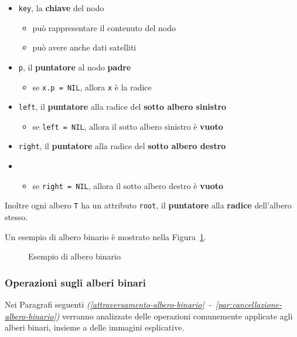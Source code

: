 \documentclass[italian, 10pt]{article}
\begin{document}
\begin{itemize}
  \item \texttt{key}, la \textbf{chiave} del nodo
        \begin{itemize}
          \item può rappresentare il contenuto del nodo
          \item può avere anche dati satelliti
        \end{itemize}
  \item \texttt{p}, il \textbf{puntatore} al nodo \textbf{padre}
        \begin{itemize}
          \item se \texttt{x.p = NIL}, allora \texttt{x} è la radice
        \end{itemize}
  \item \texttt{left}, il \textbf{puntatore} alla radice del \textbf{sotto albero sinistro}
        \begin{itemize}[label=\(\rightarrow\)]
          \item se \texttt{left = NIL}, allora il sotto albero sinistro è \textbf{vuoto}
        \end{itemize}
  \item \texttt{right}, il \textbf{puntatore} alla radice del \textbf{sotto albero destro}
  \item   \begin{itemize}[label=\(\rightarrow\)]
          \item se \texttt{right = NIL}, allora il sotto albero destro è \textbf{vuoto}
        \end{itemize}
\end{itemize}

Inoltre ogni albero \texttt{T} ha un attributo \texttt{root}, il \textbf{puntatore} alla \textbf{radice} dell'albero stesso.

\bigskip
Un esempio di albero binario è mostrato nella Figura~\ref{fig:esempio-albero-binario}.

\begin{figure}[htbp]
  \bigskip
  \centering
  \caption{Esempio di albero binario}
  \label{fig:esempio-albero-binario}
  \bigskip
\end{figure}

\subsubsection{Operazioni sugli alberi binari}

Nei Paragrafi seguenti \textit{(\ref{attraversamento-albero-binario}~-~\ref{par:cancellazione-albero-binario})} verranno analizzate delle operazioni comunemente applicate agli alberi binari, insieme a delle immagini esplicative.
\end{document}
